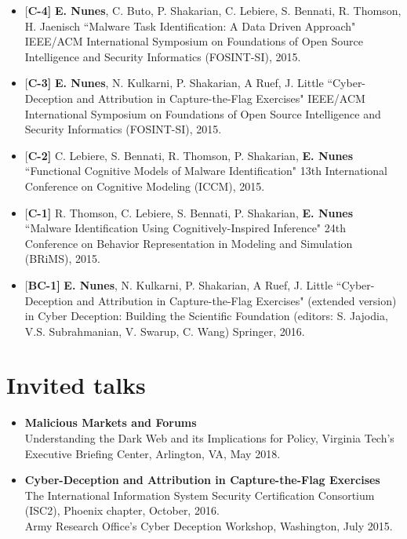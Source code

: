 \documentclass[margin,line]{CV}
\begin{document}
\begin{resume}
\begin{itemize}[leftmargin =*]
\item {[\bf C-4]} {\bf E. Nunes}, C. Buto, P. Shakarian, C. Lebiere, S. Bennati, R. Thomson, H. Jaenisch ``Malware Task Identification: A Data Driven Approach"  IEEE/ACM International Symposium on Foundations of Open Source Intelligence and Security Informatics (FOSINT-SI), 2015.

\item {[\bf C-3]} {\bf E. Nunes},  N. Kulkarni, P. Shakarian, A Ruef, J. Little ``Cyber-Deception and Attribution in Capture-the-Flag Exercises"  IEEE/ACM International Symposium on Foundations of Open Source Intelligence and Security Informatics (FOSINT-SI), 2015.

\item {[\bf C-2]} C. Lebiere, S. Bennati, R. Thomson, P. Shakarian, {\bf E. Nunes}  ``Functional Cognitive Models of Malware Identification" 13th International Conference on Cognitive Modeling (ICCM), 2015.

\item {[\bf C-1]} R. Thomson, C. Lebiere, S. Bennati, P. Shakarian, {\bf E. Nunes}   ``Malware Identification Using Cognitively-Inspired Inference" 24th Conference on Behavior Representation in Modeling and Simulation (BRiMS), 2015.

\item {[\bf BC-1]} {\bf E. Nunes}, N. Kulkarni, P. Shakarian, A Ruef, J. Little ``Cyber-Deception and Attribution in Capture-the-Flag Exercises" (extended version) in Cyber Deception: Building the Scientific Foundation (editors: S. Jajodia, V.S. Subrahmanian, V. Swarup, C. Wang) Springer, 2016.
   
\end{itemize}

\section{\sc Invited talks}
\begin{itemize}[leftmargin =*]
	
\item {\bf Malicious Markets and Forums}\\
Understanding the Dark Web and its Implications for Policy, Virginia Tech’s Executive Briefing Center, Arlington, VA, May 2018.

\item {\bf Cyber-Deception and Attribution in Capture-the-Flag Exercises}\\
The International Information System Security Certification Consortium (ISC2), Phoenix chapter, October, 2016.\\
Army Research Office's Cyber Deception Workshop, Washington, July 2015.


\end{itemize}
\end{resume}
\end{document}
